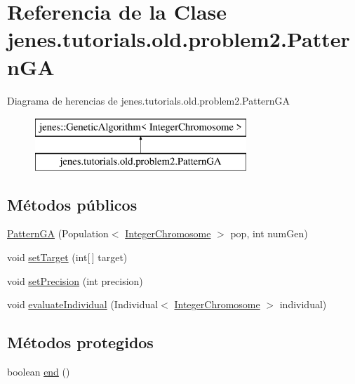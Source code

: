 \hypertarget{classjenes_1_1tutorials_1_1old_1_1problem2_1_1_pattern_g_a}{\section{Referencia de la Clase jenes.\-tutorials.\-old.\-problem2.\-Pattern\-G\-A}
\label{classjenes_1_1tutorials_1_1old_1_1problem2_1_1_pattern_g_a}
}
Diagrama de herencias de jenes.\-tutorials.\-old.\-problem2.\-Pattern\-G\-A\begin{figure}[H]
\begin{center}
\leavevmode
\includegraphics[height=2.000000cm]{classjenes_1_1tutorials_1_1old_1_1problem2_1_1_pattern_g_a}
\end{center}
\end{figure}
\subsection*{Métodos públicos}
\begin{DoxyCompactItemize}
\item 
\hyperlink{classjenes_1_1tutorials_1_1old_1_1problem2_1_1_pattern_g_a_a6c739b7abe3809978e5a2e8a41788eae}{Pattern\-G\-A} (Population$<$ \hyperlink{classjenes_1_1chromosome_1_1_integer_chromosome}{Integer\-Chromosome} $>$ pop, int num\-Gen)
\item 
void \hyperlink{classjenes_1_1tutorials_1_1old_1_1problem2_1_1_pattern_g_a_acad7ad7941fbcf7fc8d555d0218886e1}{set\-Target} (int\mbox{[}$\,$\mbox{]} target)
\item 
void \hyperlink{classjenes_1_1tutorials_1_1old_1_1problem2_1_1_pattern_g_a_a7d2561b481b6d1f87e6a5c8f602510b0}{set\-Precision} (int precision)
\item 
void \hyperlink{classjenes_1_1tutorials_1_1old_1_1problem2_1_1_pattern_g_a_a90edfd135e58f9a43e3722d9e1df6f95}{evaluate\-Individual} (Individual$<$ \hyperlink{classjenes_1_1chromosome_1_1_integer_chromosome}{Integer\-Chromosome} $>$ individual)
\end{DoxyCompactItemize}
\subsection*{Métodos protegidos}
\begin{DoxyCompactItemize}
\item 
boolean \hyperlink{classjenes_1_1tutorials_1_1old_1_1problem2_1_1_pattern_g_a_a4c05b8a32518e4fe78f66e2576014bd9}{end} ()
\end{DoxyCompactItemize}



